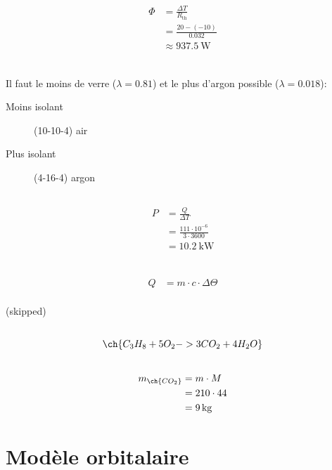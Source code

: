 \documentclass{article}
\let\ce\ch
\begin{document}
\begin{align*}
	\Phi &= \frac{\Delta T}{R_{\text{th}}} \\
          &= \frac{20 - (-10)}{0.032} \\
	  &\approx \SI{937.5}{\watt} \\
\end{align*}

\setcounter{subsection}{4}

\subsection{}

Il faut le moins de verre ($\lambda = 0.81$) et le plus d'argon possible ($\lambda = 0.018$):
\begin{description}
	\item[Moins isolant] (10-10-4) air
	\item[Plus isolant] (4-16-4) argon
\end{description}

\subsection{}

\begin{align*}
	P&= \frac{Q}{\Delta T} \\
	&= \frac{111 \cdot 10^{-6}}{3 \cdot 3600} \\
	&= \SI{10.2}{\kilo\watt} \\
\end{align*}

\subsection{}
\begin{align*}
	Q &= m \cdot c \cdot \Delta\Theta \\
\end{align*}

(skipped)

\setcounter{subsection}{8}

\subsection{}

\[
	\ce{C_3H_8+5O_2 -> 3CO_2+4H_2O}
\] 

\subsection{}

\begin{align*}
	m_{\ce{CO_2}} &= m \cdot M \\
	&= 210 \cdot 44 \\
	&= \SI{9}{\kilo\gram} \\
\end{align*}

\newpage\section{Modèle orbitalaire}
\end{document}
